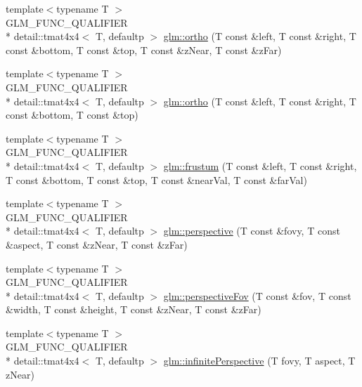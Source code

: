 \begin{DoxyCompactItemize}
\item 
{\footnotesize template$<$typename T $>$ }\\G\-L\-M\-\_\-\-F\-U\-N\-C\-\_\-\-Q\-U\-A\-L\-I\-F\-I\-E\-R \\*
detail\-::tmat4x4$<$ T, defaultp $>$ \hyperlink{group__gtc__matrix__transform_gac393e9262776e4980731c386123e4377}{glm\-::ortho} (T const \&left, T const \&right, T const \&bottom, T const \&top, T const \&z\-Near, T const \&z\-Far)
\item 
{\footnotesize template$<$typename T $>$ }\\G\-L\-M\-\_\-\-F\-U\-N\-C\-\_\-\-Q\-U\-A\-L\-I\-F\-I\-E\-R \\*
detail\-::tmat4x4$<$ T, defaultp $>$ \hyperlink{group__gtc__matrix__transform_gab03587bce3510aa5d2f4e5f1be6c2370}{glm\-::ortho} (T const \&left, T const \&right, T const \&bottom, T const \&top)
\item 
{\footnotesize template$<$typename T $>$ }\\G\-L\-M\-\_\-\-F\-U\-N\-C\-\_\-\-Q\-U\-A\-L\-I\-F\-I\-E\-R \\*
detail\-::tmat4x4$<$ T, defaultp $>$ \hyperlink{group__gtc__matrix__transform_ga486d3d6819c04880559f3dccd38f9f58}{glm\-::frustum} (T const \&left, T const \&right, T const \&bottom, T const \&top, T const \&near\-Val, T const \&far\-Val)
\item 
{\footnotesize template$<$typename T $>$ }\\G\-L\-M\-\_\-\-F\-U\-N\-C\-\_\-\-Q\-U\-A\-L\-I\-F\-I\-E\-R \\*
detail\-::tmat4x4$<$ T, defaultp $>$ \hyperlink{group__gtc__matrix__transform_ga6c82aa0ea748cfbb16887d81cf6c5a10}{glm\-::perspective} (T const \&fovy, T const \&aspect, T const \&z\-Near, T const \&z\-Far)
\item 
{\footnotesize template$<$typename T $>$ }\\G\-L\-M\-\_\-\-F\-U\-N\-C\-\_\-\-Q\-U\-A\-L\-I\-F\-I\-E\-R \\*
detail\-::tmat4x4$<$ T, defaultp $>$ \hyperlink{group__gtc__matrix__transform_gac00bf68d4f7ec62380b84c5354567f71}{glm\-::perspective\-Fov} (T const \&fov, T const \&width, T const \&height, T const \&z\-Near, T const \&z\-Far)
\item 
{\footnotesize template$<$typename T $>$ }\\G\-L\-M\-\_\-\-F\-U\-N\-C\-\_\-\-Q\-U\-A\-L\-I\-F\-I\-E\-R \\*
detail\-::tmat4x4$<$ T, defaultp $>$ \hyperlink{group__gtc__matrix__transform_ga63ba1ddb9c4a08d4e58becd0dc5b725a}{glm\-::infinite\-Perspective} (T fovy, T aspect, T z\-Near)

\end{DoxyCompactItemize}
